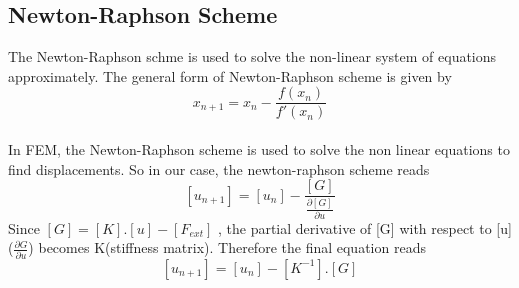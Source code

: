 \documentclass[a4paper,12pt]{article}
\begin{document}
\subsection*{Newton-Raphson Scheme}
The Newton-Raphson schme is used to solve the non-linear system of equations approximately. The general form of Newton-Raphson scheme is given by
$$  
 x_{n+1} = x_n - \frac{f(x_n)}{f'(x_n)}
$$
\\
In FEM, the Newton-Raphson scheme is used to solve the non linear equations to find displacements. So in our case, the newton-raphson scheme reads
$$  
[u_{n+1}] = [u_n] - \frac{[G]}{\frac{\partial [G]}{\partial u}}
$$
Since $ [G] = [K].[u] - [F_{ext}] $ , the partial derivative of [G] with respect to [u] ($\frac{\partial G}{\partial u}$) becomes K(stiffness matrix). Therefore the final equation reads
$$  
[u_{n+1}] = [u_n] - [K^{-1}].[G]
$$
\end{document}
